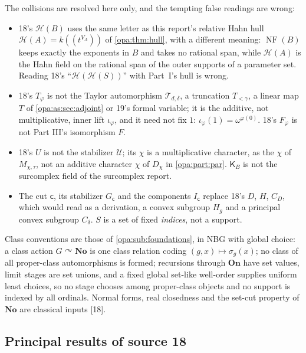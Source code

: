 \documentclass[11pt,oneside]{article}
\numberwithin{equation}{section}
\theoremstyle{definition}
\theoremstyle{remark}
\newcommand{\No}{\mathbf{No}}
\newcommand{\UU}{\mathcal U}
\newcommand{\HH}{\mathcal H}
\newcommand{\Hahn}[2]{#1((t^{#2}))}
\newcommand{\src}[1]{\textup{\textsf{\small[#1]}}}
\newcommand{\On}{\mathbf{On}}
\newcommand{\NF}{\operatorname{NF}}
\begin{document}
The collisions are resolved here only, and the tempting false readings are wrong:
\begin{itemize}[itemsep=1pt]
\item 18's $\mathcal H(B)$ uses the same letter as this report's relative Hahn hull $\HH(A)=\Hahn k{V_A}$ of \cref{opa:thm:hull},
with a different meaning: $\NF(B)$ keeps exactly the exponents in $B$ and takes no rational span, while $\HH(A)$ is the Hahn field
on the rational span of the outer supports of a parameter set. Reading 18's ``$\mathcal H(\mathcal H(S))$'' with Part~I's hull is
wrong.
\item 18's $T_\varphi$ is not the Taylor automorphism $\mathcal T_{d,\delta}$, a truncation $T_{<\gamma}$, a linear map $T$ of
\cref{opa:as:sec:adjoint} or 19's formal variable; it is the additive, not multiplicative, inner lift $\iota_\varphi$, and it need
not fix $1$: $\iota_\varphi(1)=\omega^{\varphi(0)}$. 18's $F_\varphi$ is not Part III's isomorphism $F$.
\item 18's $U$ is not the stabilizer $\UU$; its $\chi$ is a multiplicative character, as the $\chi$ of $M_{\chi,\tau}$, not an
additive character $\chi$ of $D_\chi$ in \cref{opa:part:par}. $\mathsf K_B$ is not the surcomplex field of the surcomplex report.
\item The cut $\mathsf c$, its stabilizer $G_{\mathsf c}$ and the components $I_{\mathsf c}$ replace 18's $D$, $H$, $C_D$, which would
read as a derivation, a convex subgroup $H_g$ and a principal convex subgroup $C_\delta$. $S$ is a set of fixed \emph{indices}, not a
support.
\end{itemize}
Class conventions are those of \cref{opa:sub:foundations}, in NBG with global choice: a class action $G\curvearrowright\No$ is one
class relation coding $(g,x)\mapsto\sigma_g(x)$; no class of all proper-class automorphisms is formed; recursions through $\On$ have
set values, limit stages are set unions, and a fixed global set-like well-order supplies uniform least choices, so no stage chooses
among proper-class objects and no support is indexed by all ordinals. Normal forms, real closedness and the set-cut property of
$\No$ are classical inputs \cite{Conway,Gonshor} \src{18}.

\subsection{Principal results of source 18}\label{opa:es:sub:results}
\end{document}
